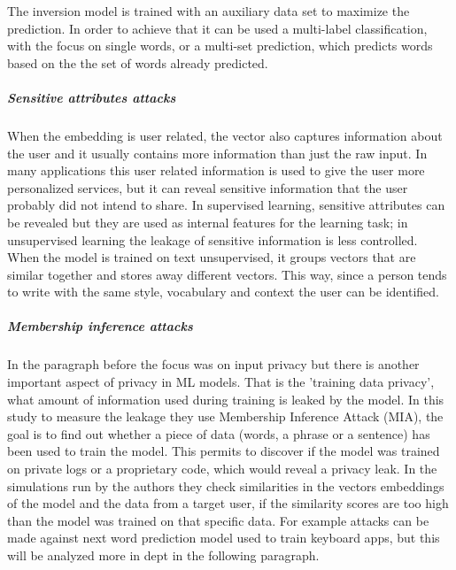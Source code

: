 The inversion model is trained with an auxiliary data set to maximize the prediction. In order to achieve that it can be used a multi-label classification, with the focus on single words, or a multi-set prediction, which predicts words based on the the set of words already predicted. 
\subparagraph{Sensitive attributes attacks} When the embedding is user related, the vector also captures information about the user and it usually contains more information than just the raw input. 
In many applications this user related information is used to give the user more personalized services, but it can reveal sensitive information that the user probably did not intend to share.
In supervised learning, sensitive attributes can be revealed but they are used as internal features for the learning task; in unsupervised learning the leakage of sensitive information is less controlled. 
 When the model is trained on text unsupervised, it groups vectors that are similar together and stores away different vectors. This way, since a person tends to write with the same style, vocabulary and context the user can be identified. 

\subparagraph{Membership inference attacks}\label{subsection:NextWordPredictions} In the paragraph before the focus was on input privacy but there is another important aspect of privacy in ML models. That is the 'training data privacy', what amount of information used during training is leaked by the model.
In this study \cite{embeddingModels} to measure the leakage they use Membership Inference Attack (MIA), the goal is to find out whether a piece of data (words, a phrase or a sentence) has been used to train the model. This permits to discover if the model was trained on private logs or a proprietary code, which would reveal a privacy leak. 
In the simulations run by the authors they check similarities in the vectors embeddings of the model and the data from a target user, if the similarity scores are too high than the model was trained on that specific data.
For example attacks can be made against next word prediction model used to train keyboard apps, but this will be analyzed more in dept in the following paragraph.


